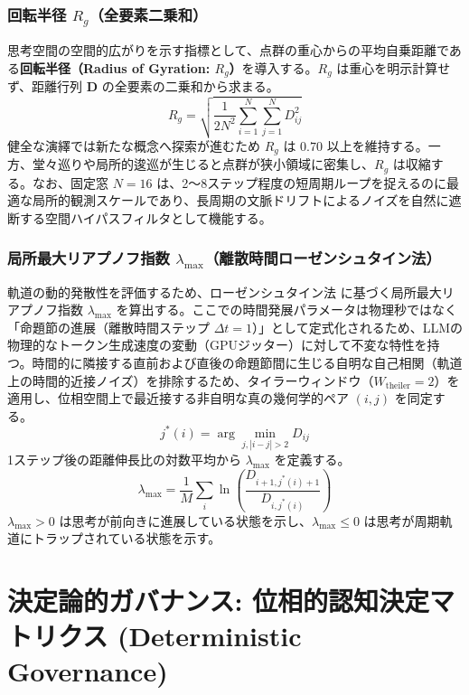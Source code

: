 \documentclass[11pt,a4paper]{article}
\begin{document}
\subsubsection{回転半径 $R_g$（全要素二乗和）}
思考空間の空間的広がりを示す指標として、点群の重心からの平均自乗距離である\textbf{回転半径（Radius of Gyration: $R_g$）}を導入する。$R_g$ は重心を明示計算せず、距離行列 $\mathbf{D}$ の全要素の二乗和から求まる。
\begin{equation}
R_g = \sqrt{\frac{1}{2N^2} \sum_{i=1}^N \sum_{j=1}^N D_{ij}^2}
\end{equation}
健全な演繹では新たな概念へ探索が進むため $R_g$ は $0.70$ 以上を維持する。一方、堂々巡りや局所的逡巡が生じると点群が狭小領域に密集し、$R_g$ は収縮する。なお、固定窓 $N=16$ は、2〜8ステップ程度の短周期ループを捉えるのに最適な局所的観測スケールであり、長周期の文脈ドリフトによるノイズを自然に遮断する空間ハイパスフィルタとして機能する。

\subsubsection{局所最大リアプノフ指数 $\lambda_{\max}$（離散時間ローゼンシュタイン法）}
軌道の動的発散性を評価するため、ローゼンシュタイン法 \cite{rosenstein1993practical} に基づく局所最大リアプノフ指数 $\lambda_{\max}$ を算出する。ここでの時間発展パラメータは物理秒ではなく「命題節の進展（離散時間ステップ $\Delta t = 1$）」として定式化されるため、LLMの物理的なトークン生成速度の変動（GPUジッター）に対して不変な特性を持つ。時間的に隣接する直前および直後の命題節間に生じる自明な自己相関（軌道上の時間的近接ノイズ）を排除するため、タイラーウィンドウ（$W_{\mathrm{theiler}} = 2$）を適用し、位相空間上で最近接する非自明な真の幾何学的ペア $(i, j)$ を同定する。
\begin{equation}
j^*(i) = \arg\min_{j, |i-j| > 2} D_{ij}
\end{equation}
1ステップ後の距離伸長比の対数平均から $\lambda_{\max}$ を定義する。
\begin{equation}
\lambda_{\max} = \frac{1}{M} \sum_{i} \ln \left( \frac{D_{i+1, j^*(i)+1}}{D_{i, j^*(i)}} \right)
\end{equation}
$\lambda_{\max} > 0$ は思考が前向きに進展している状態を示し、$\lambda_{\max} \le 0$ は思考が周期軌道にトラップされている状態を示す。

\section{決定論的ガバナンス: 位相的認知決定マトリクス (Deterministic Governance)}
\end{document}

